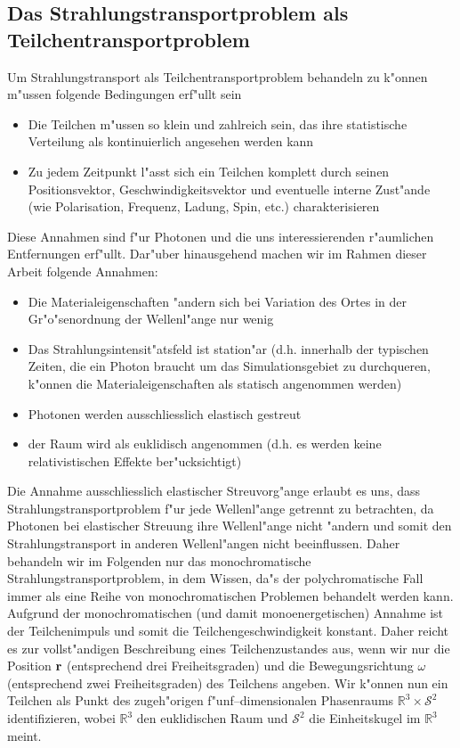 	\subsection{Das Strahlungstransportproblem als Teilchentransportproblem}
	Um Strahlungstransport als Teilchentransportproblem behandeln zu k"onnen m"ussen folgende Bedingungen erf"ullt sein
	\begin{itemize}
		\item{Die Teilchen m"ussen so klein und zahlreich sein, das ihre statistische Verteilung als kontinuierlich angesehen werden kann}
		\item{Zu jedem Zeitpunkt l"asst sich ein Teilchen komplett durch seinen Positionsvektor, Geschwindigkeitsvektor und eventuelle interne Zust"ande (wie Polarisation, Frequenz, Ladung, Spin, etc.) charakterisieren}
	\end{itemize}
	Diese Annahmen sind f"ur Photonen und die uns interessierenden r"aumlichen Entfernungen erf"ullt.
	Dar"uber hinausgehend machen wir im Rahmen dieser Arbeit folgende Annahmen:
	\begin{itemize}
		\item{Die Materialeigenschaften "andern sich bei Variation des Ortes in der Gr"o"senordnung der Wellenl"ange nur wenig}
		\item{Das Strahlungsintensit"atsfeld ist station"ar (d.h. innerhalb der typischen Zeiten, die ein Photon braucht um das Simulationsgebiet zu durchqueren, k"onnen die Materialeigenschaften als statisch angenommen werden)}
		\item{Photonen werden ausschliesslich elastisch gestreut}
		\item{der Raum wird als euklidisch angenommen (d.h. es werden keine relativistischen Effekte ber"ucksichtigt)}
	\end{itemize}
	Die Annahme ausschliesslich elastischer Streuvorg"ange erlaubt es uns, dass Strahlungstransportproblem f"ur jede Wellenl"ange getrennt zu betrachten, da Photonen bei elastischer Streuung ihre Wellenl"ange nicht "andern und somit den Strahlungstransport in anderen Wellenl"angen nicht beeinflussen. Daher behandeln wir im Folgenden nur das monochromatische Strahlungstransportproblem, in dem Wissen, da"s der polychromatische Fall immer als eine Reihe von monochromatischen Problemen behandelt werden kann. Aufgrund der monochromatischen (und damit monoenergetischen) Annahme ist der Teilchenimpuls und somit die Teilchengeschwindigkeit konstant. Daher reicht es zur vollst"andigen Beschreibung eines Teilchenzustandes aus, wenn wir nur die Position $\mathbf{r}$ (entsprechend drei Freiheitsgraden) und die Bewegungsrichtung $\omega$ (entsprechend zwei Freiheitsgraden) des Teilchens angeben. Wir k"onnen nun ein Teilchen als Punkt des zugeh"origen f"unf--dimensionalen Phasenraums $\mathbb{R}^3 \times \mathcal{S}^2$ identifizieren, wobei $\mathbb{R}^3$ den euklidischen Raum und $\mathcal{S}^2$ die Einheitskugel im $\mathbb{R}^3$ meint.
	
